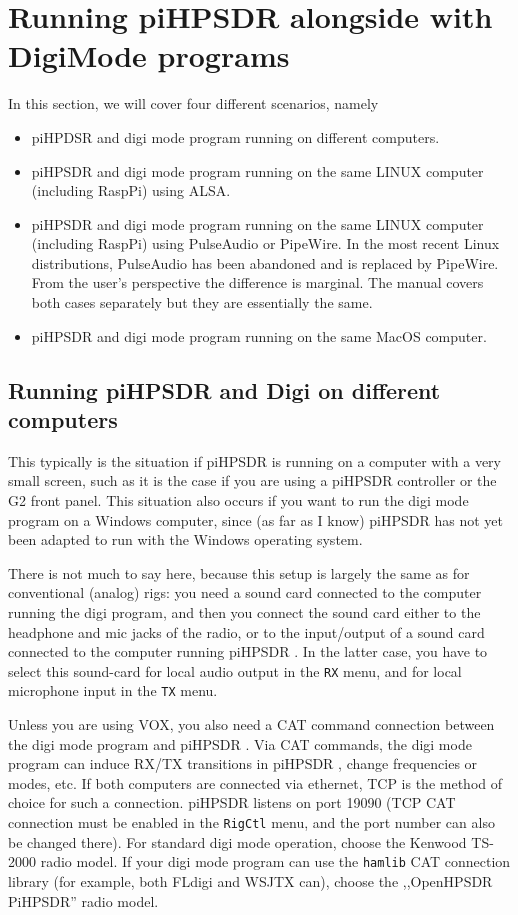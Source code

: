 \documentclass[12pt]{book}
\def\bltt#1{\texttt{\color{blue}#1}}
\def\pH{pi\-HPSDR }
\begin{document}
\chapter[\pH and digi mode programs]{Running \pH alongside with DigiMode programs}

In this section, we will cover four different scenarios, namely
\begin{itemize}
\item{piHPDSR and digi mode program running on different computers.}
\item{\pH and digi mode program running on the same LINUX computer
(including RaspPi) using ALSA.}
\item{\pH and digi mode program running on the same LINUX computer
(including RaspPi) using PulseAudio or PipeWire. {\color{red} In the most recent Linux distributions,
 PulseAudio has been abandoned and is replaced by
PipeWire. From the user's perspective the difference is marginal.
The manual covers both cases separately but they are essentially the same.}}
\item{\pH and digi mode program running on the same MacOS computer.}
\end{itemize}



\section[\pH and Digi on different computers]{Running \pH and Digi on different computers}

This typically is the situation if \pH is running on a computer with a very small
screen, such as it is the case if you are using a \pH controller or the G2 front panel.
This situation also occurs if you want to run the digi mode program on a Windows computer,
since (as far as I know) \pH has not yet been adapted to run with the Windows operating
system.

There is not much to say here, because this setup is largely the same as for conventional
(analog) rigs: you need a sound card connected to the computer running the digi program,
and then you connect the sound card either to the headphone and mic jacks of the radio,
or to the input/output of a sound card connected to the computer running \pH. In the
latter case, you have to select this sound-card for local audio output in the \bltt{RX} menu,
and for local microphone input in the \bltt{TX} menu.

Unless you are using VOX, you also need a CAT command connection between the digi mode program
and \pH. Via CAT commands, the digi mode program can induce RX/TX transitions in \pH,
change frequencies or modes, etc. If both computers are connected via ethernet,
TCP is the method of choice for such a connection. \pH listens on port 19090 (TCP CAT
connection must be enabled in the \bltt{RigCtl} menu, and the port number can also
be changed there). For standard digi mode operation, choose the
Kenwood TS-2000 radio model. If your digi mode program can use the \texttt{hamlib} CAT connection
library (for example, both FLdigi and WSJTX can), choose the ,,OpenHPSDR PiHPSDR'' radio
model.
\end{document}

